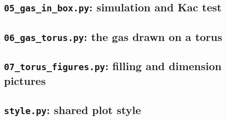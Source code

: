 \documentclass[11pt,a4paper]{article}
\theoremstyle{definition}
\begin{document}
\subsection{\texttt{05\_gas\_in\_box.py}: simulation and Kac test}


\subsection{\texttt{06\_gas\_torus.py}: the gas drawn on a torus}


\subsection{\texttt{07\_torus\_figures.py}: filling and dimension pictures}


\subsection{\texttt{style.py}: shared plot style}

\end{document}
